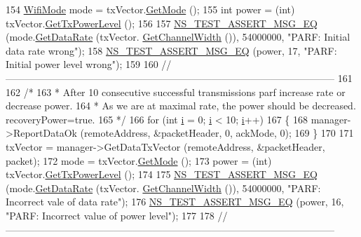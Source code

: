 \begin{DoxyCode}
154   \hyperlink{classns3_1_1WifiMode}{WifiMode} mode = txVector.\hyperlink{classns3_1_1WifiTxVector_a497b1f11cad4b8b26251dfa07c9ad1d6}{GetMode} ();
155   \textcolor{keywordtype}{int} power = (int) txVector.\hyperlink{classns3_1_1WifiTxVector_a7c98bd9609ff1c5cefa6e22d6908a2fe}{GetTxPowerLevel} ();
156 
157   \hyperlink{group__testing_ga2a9d78cffb3db8e867c35fff0b698cf5}{NS\_TEST\_ASSERT\_MSG\_EQ} (mode.\hyperlink{classns3_1_1WifiMode_adcfbe150f69da720db23387f733b8a52}{GetDataRate} (txVector.
      \hyperlink{classns3_1_1WifiTxVector_a1f8bfa51778a3e217581eb665f059564}{GetChannelWidth} ()), 54000000, \textcolor{stringliteral}{"PARF: Initial data rate wrong"});
158   \hyperlink{group__testing_ga2a9d78cffb3db8e867c35fff0b698cf5}{NS\_TEST\_ASSERT\_MSG\_EQ} (power, 17, \textcolor{stringliteral}{"PARF: Initial power level wrong"});
159 
160   \textcolor{comment}{//-----------------------------------------------------------------------------------------------------}
161 
162   \textcolor{comment}{/*}
163 \textcolor{comment}{   * After 10 consecutive successful transmissions parf increase rate or decrease power.}
164 \textcolor{comment}{   * As we are at maximal rate, the power should be decreased. recoveryPower=true.}
165 \textcolor{comment}{   */}
166   \textcolor{keywordflow}{for} (\textcolor{keywordtype}{int} \hyperlink{bernuolliDistribution_8m_a6f6ccfcf58b31cb6412107d9d5281426}{i} = 0; \hyperlink{bernuolliDistribution_8m_a6f6ccfcf58b31cb6412107d9d5281426}{i} < 10; \hyperlink{bernuolliDistribution_8m_a6f6ccfcf58b31cb6412107d9d5281426}{i}++)
167     \{
168       manager->ReportDataOk (remoteAddress, &packetHeader, 0, ackMode, 0);
169     \}
170 
171   txVector = manager->GetDataTxVector (remoteAddress, &packetHeader, packet);
172   mode = txVector.\hyperlink{classns3_1_1WifiTxVector_a497b1f11cad4b8b26251dfa07c9ad1d6}{GetMode} ();
173   power = (int) txVector.\hyperlink{classns3_1_1WifiTxVector_a7c98bd9609ff1c5cefa6e22d6908a2fe}{GetTxPowerLevel} ();
174 
175   \hyperlink{group__testing_ga2a9d78cffb3db8e867c35fff0b698cf5}{NS\_TEST\_ASSERT\_MSG\_EQ} (mode.\hyperlink{classns3_1_1WifiMode_adcfbe150f69da720db23387f733b8a52}{GetDataRate} (txVector.
      \hyperlink{classns3_1_1WifiTxVector_a1f8bfa51778a3e217581eb665f059564}{GetChannelWidth} ()), 54000000, \textcolor{stringliteral}{"PARF: Incorrect vale of data rate"});
176   \hyperlink{group__testing_ga2a9d78cffb3db8e867c35fff0b698cf5}{NS\_TEST\_ASSERT\_MSG\_EQ} (power, 16, \textcolor{stringliteral}{"PARF: Incorrect value of power level"});
177 
178   \textcolor{comment}{//-----------------------------------------------------------------------------------------------------}

\end{DoxyCode}
